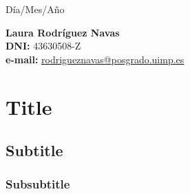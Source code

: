 \documentclass{uimppracticas}
\begin{document}
	
\frontmatter


\begin{center}
\large Día/Mes/Año
\end{center}

\vspace{40mm}

\begin{flushright}
 	{\bf Laura Rodríguez Navas}\\
 	\textbf{DNI:} 43630508-Z\\
 	\textbf{e-mail:} \href{rodrigueznavas@posgrado.uimp.es}{rodrigueznavas@posgrado.uimp.es}
\end{flushright}

\newpage

\tableofcontents

\newpage

\mainmatter

\section{Title}
\subsection{Subtitle}
\subsubsection{Subsubtitle}
\end{document}
